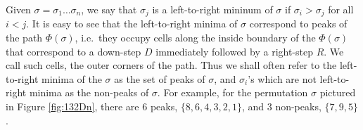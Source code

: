 \documentclass[
final,nomarks
]{dmtcs-episciences}
\newcommand{\fref}[1]{Figure \ref{fig:#1}}
\begin{document}
Given \begin{math}\sigma = \sigma_1 \ldots \sigma_n\end{math}, we say that \begin{math}\sigma_j\end{math} is a left-to-right mininum of \begin{math}\sigma\end{math} if 
\begin{math}\sigma_i > \sigma_j\end{math} for all \begin{math}i < j\end{math}. It is easy to see that the left-to-right minima 
of \begin{math}\sigma\end{math} correspond to peaks of the path \begin{math}\Phi(\sigma)\end{math}, i.e.\ they occupy cells along the inside 
boundary of the \begin{math}\Phi(\sigma)\end{math} that correspond to a down-step \begin{math}D\end{math} immediately followed by a 
right-step \begin{math}R\end{math}.  We call such cells, the outer corners of the path. 
Thus we shall often refer to the left-to-right minima 
of the \begin{math}\sigma\end{math} as the set of peaks of \begin{math}\sigma\end{math}, and \begin{math}\sigma_i\end{math}'s which are not left-to-right 
minima as the non-peaks of \begin{math}\sigma\end{math}. For example, for the permutation \begin{math}\sigma\end{math} pictured in 
\fref{132Dn}, there are \begin{math}6\end{math} peaks,  \begin{math}\{8,6,4,3,2,1\}\end{math}, and \begin{math}3\end{math} non-peaks, \begin{math}\{7,9,5\}\end{math}. 
\end{document}
